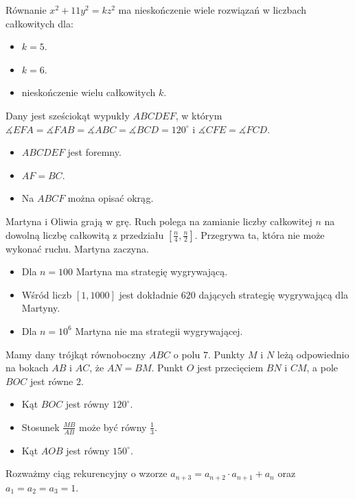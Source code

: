 \documentclass[12pt, a4paper]{article}
\newcommand{\question}[1]{\normalitem \begin{samepage}#1 \end{samepage}}
\newcommand{\questionwithasterix}[1]{ \asterixitem \begin{samepage}#1 \vspace{6cm}\end{samepage}}
\begin{document}
\begin{enumerate}
	\questionwithasterix {
		Równanie $x^2+11y^2=kz^2$ ma nieskończenie wiele rozwiązań w liczbach całkowitych dla:
	
		\begin{itemize}
			\item $k=5$.
			\item $k=6$.
			\item nieskończenie wielu całkowitych $k$.
		\end{itemize}
	}
	
	\question{
		Dany jest sześciokąt wypukły $ABCDEF$, w którym $\measuredangle  EFA = \measuredangle FAB = \measuredangle ABC = \measuredangle BCD = 120^{\circ}$ i $\measuredangle CFE = \measuredangle FCD$.
	
		\begin{itemize}
			\item $ABCDEF$ jest foremny.
			\item $AF = BC$.
			\item Na $ABCF$ można opisać okrąg.
		\end{itemize}
	}
	
	\question{
		 Martyna i Oliwia grają w grę. Ruch polega na zamianie liczby całkowitej $n$ na dowolną liczbę całkowitą z przedziału $[\frac{n}{4},\frac{n}{2}]$. Przegrywa ta, która nie może wykonać ruchu. Martyna zaczyna.
	
		\begin{itemize}
			\item Dla $n=100$ Martyna ma strategię wygrywającą.
			\item Wśród liczb $[1,1000]$ jest dokładnie $620$ dających strategię wygrywającą dla Martyny.
			\item Dla $n=10^6$ Martyna nie ma strategii wygrywającej.
		\end{itemize}
	}
	
	\question{
		Mamy dany trójkąt równoboczny $ABC$ o polu $7$. Punkty $M$ i $N$ leżą odpowiednio na bokach $AB$ i $AC$, że $AN=BM$. Punkt $O$ jest przecięciem $BN$ i $CM$, a pole $BOC$ jest równe $2$.
	
		\begin{itemize}
			\item Kąt $BOC$ jest równy $120^{\circ}$.
			\item Stosunek $\frac {MB}{AB}$ może być równy $\frac{1}{3}$.
			\item Kąt $AOB$ jest równy $150^{\circ}$.
		\end{itemize}
	}
	
	\question {
		Rozważmy ciąg rekurencyjny o wzorze $a_{n+3}=a_{n+2} \cdot a_{n+1}+a_{n}$ oraz $a_1=a_2=a_3=1$.
	
}
\end{enumerate}
\end{document}
